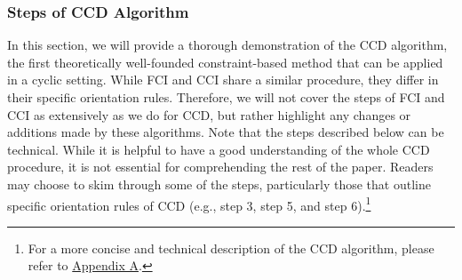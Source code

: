 \documentclass[twoside, 11pt]{article}
\newcommand{\udot}[1]{%
    \tikz[baseline=(todotted.base)]{
        \node[inner sep=1pt,outer sep=0pt] (todotted) {#1};
        \draw[dotted, thick] (todotted.south west) -- (todotted.south east);
    }%
}%
\newcommand{\starstar}{%
\begin{tikzpicture}[baseline=-3pt]
    \draw [{Rays[n=6]}-{Rays[n=6]}] (0,0) -- (0.55,0);
\end{tikzpicture}
}
\newcommand{\circstar}{%
\begin{tikzpicture}
    \draw [{Circle[open]}-{Rays[n=6]}] (0,0) -- (0.55, 0);
\end{tikzpicture}
}
\newcommand{\tailarrow}{%
\begin{tikzpicture}
    \draw [-{Straight Barb[length=2.5pt]}](0,0) -- (0.4, 0);
\end{tikzpicture}
}
\newcommand{\arrowtail}{%
\begin{tikzpicture}
    \draw [{Straight Barb[length=2.5pt]}-](0,0) -- (0.4, 0);
\end{tikzpicture}
}
\begin{document}

    

\subsubsection{Steps of CCD Algorithm}
In this section, we will provide a thorough demonstration of the CCD algorithm, the first theoretically well-founded constraint-based method that can be applied in a cyclic setting. While FCI and CCI share a similar procedure, they differ in their specific orientation rules. Therefore, we will not cover the steps of FCI and CCI as extensively as we do for CCD, but rather highlight any changes or additions made by these algorithms. 
Note that the steps described below can be technical. While it is helpful to have a good understanding of the whole CCD procedure, it is not essential for comprehending the rest of the paper. Readers may choose to skim through some of the steps, particularly those that outline specific orientation rules of CCD (e.g., step 3, step 5, and step 6).\footnote{For a more concise and technical description of the CCD algorithm, please refer to \hyperref[algCCD]{Appendix A}.}
\end{document}
